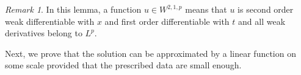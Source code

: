 \documentclass[preprint,12pt]{elsarticle}
\newtheorem{lemma}[theorem]{Lemma}
\theoremstyle{definition}
\theoremstyle{remark}
\newtheorem{remark}[theorem]{Remark}
\numberwithin{equation}{section}
\begin{document}
\begin{remark}\label{re.closed.1}
In this lemma, a function $u\in W^{2,1,p}$ means that $u$ is second order weak differentiable with $x$ and first order differentiable with $t$ and all weak derivatives belong to $L^p$.
\end{remark}

%
%
%

Next, we prove that the solution can be approximated by a linear function on some scale provided that the prescribed data are small enough.
\end{document}
